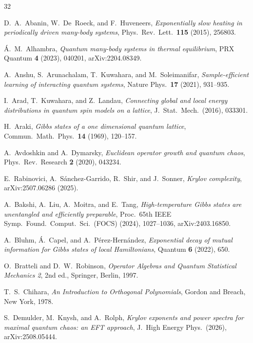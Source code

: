 \documentclass[11pt,a4paper]{article}
\numberwithin{equation}{section}
\theoremstyle{plain}
\theoremstyle{definition}
\begin{document}
\begin{thebibliography}{32}

D.~A.~Abanin, W.~De~Roeck, and F.~Huveneers,
\textit{Exponentially slow heating in periodically driven many-body systems},
Phys.\ Rev.\ Lett.\ \textbf{115} (2015), 256803.

\'A.~M.~Alhambra,
\textit{Quantum many-body systems in thermal equilibrium},
PRX Quantum \textbf{4} (2023), 040201, arXiv:2204.08349.

A.~Anshu, S.~Arunachalam, T.~Kuwahara, and M.~Soleimanifar,
\textit{Sample-efficient learning of interacting quantum systems},
Nature Phys.\ \textbf{17} (2021), 931--935.

I.~Arad, T.~Kuwahara, and Z.~Landau,
\textit{Connecting global and local energy distributions in quantum spin models on a lattice},
J.\ Stat.\ Mech.\ (2016), 033301.

H.~Araki,
\textit{Gibbs states of a one dimensional quantum lattice},
Commun.\ Math.\ Phys.\ \textbf{14} (1969), 120--157.

A.~Avdoshkin and A.~Dymarsky,
\textit{Euclidean operator growth and quantum chaos},
Phys.\ Rev.\ Research \textbf{2} (2020), 043234.

E.~Rabinovici, A.~S\'anchez-Garrido, R.~Shir, and J.~Sonner,
\textit{Krylov complexity},
arXiv:2507.06286 (2025).

A.~Bakshi, A.~Liu, A.~Moitra, and E.~Tang,
\textit{High-temperature Gibbs states are unentangled and efficiently preparable},
Proc.\ 65th IEEE Symp.\ Found.\ Comput.\ Sci.\ (FOCS) (2024), 1027--1036, arXiv:2403.16850.

A.~Bluhm, \'A.~Capel, and A.~P\'erez-Hern\'andez,
\textit{Exponential decay of mutual information for Gibbs states of local Hamiltonians},
Quantum \textbf{6} (2022), 650.

O.~Bratteli and D.~W.~Robinson,
\textit{Operator Algebras and Quantum Statistical Mechanics 2},
2nd ed., Springer, Berlin, 1997.

T.~S.~Chihara,
\textit{An Introduction to Orthogonal Polynomials},
Gordon and Breach, New York, 1978.

S.~Demulder, M.~Knysh, and A.~Rolph,
\textit{Krylov exponents and power spectra for maximal quantum chaos: an EFT approach},
J.\ High Energy Phys.\ (2026), arXiv:2508.05444.


\end{thebibliography}
\end{document}
